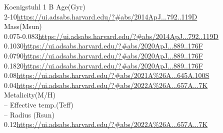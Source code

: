 Koenigstuhl 1 B
Age(Gyr)\\
2-10\url{https://ui.adsabs.harvard.edu/?#abs/2014ApJ...792..119D}\\
Mass(Msun)\\
0.075-0.083\url{https://ui.adsabs.harvard.edu/?#abs/2014ApJ...792..119D}\\
0.1030\url{https://ui.adsabs.harvard.edu/?#abs/2020ApJ...889..176F}\\
0.0790\url{https://ui.adsabs.harvard.edu/?#abs/2020ApJ...889..176F}\\
0.1820\url{https://ui.adsabs.harvard.edu/?#abs/2020ApJ...889..176F}\\
0.08\url{https://ui.adsabs.harvard.edu/?#abs/2021A%26A...645A.100S}\\
0.04\url{https://ui.adsabs.harvard.edu/?#abs/2022A%26A...657A...7K}\\
Metalicity(M/H)\\
--
Effective temp.(Teff)\\
--
Radius (Rsun)\\
0.12\url{https://ui.adsabs.harvard.edu/?#abs/2022A%26A...657A...7K}\\\url{}\\
\url{}\\
\url{}\\
\url{}\\
